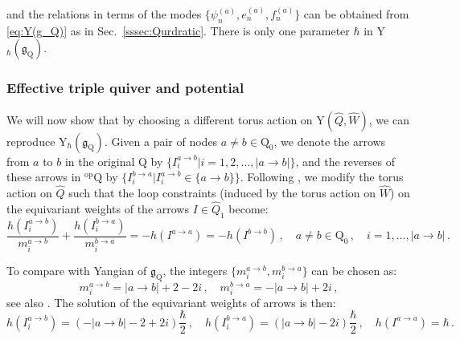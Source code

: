 \documentclass[12pt,a4paper]{article}
\renewcommand{\(}{\left(}
\renewcommand{\)}{\right)}
\renewcommand{\(}{\left(}
\renewcommand{\)}{\right)}
\begin{document}
\noindent and the relations in terms of the modes $\{\psi^{(a)}_n,e^{(a)}_n,f^{(a)}_n\}$ can be obtained from \eqref{eq:Y(g_Q)} as in Sec.~\ref{sssec:Qurdratic}.
There is only one parameter $\hbar$ in Y$_\hbar(\mathfrak{g}_{\mathrm{Q}})$.

\subsubsection{Effective triple quiver and potential}

We will now show that by choosing a different torus action on Y$(\widehat{Q},\widehat{W})$, we can reproduce Y$_\hbar(\mathfrak{g}_{\mathrm{Q}})$.
Given a pair of nodes $a\neq b\in\mathrm{Q}_0$, we denote the arrows from $a$ to $b$ in the original $\mathrm{Q}$ by $\{I^{a\rightarrow b}_i|i=1,2,\dots, |a\to b|\} $, and the reverses of these arrows in ${}^{\textrm{op}}\mathrm{Q}$ by $\{I^{b\rightarrow a}_i|I^{a\rightarrow b}_i\in \{a\to b\}\}$. 
Following \cite{Yang_2014}, we modify the torus action on $\widehat{Q}$ such that the loop constraints (induced by the torus action on $\widehat{W}$) on the equivariant weights of the arrows $I\in \widehat{Q}_1$ become:
\begin{equation}\label{eq:loop_constraints_assumption}
\frac{h(I^{a\rightarrow b}_i)}{m^{a\rightarrow b}_i }+\frac{h(I^{b\rightarrow a}_i) }{m^{b\rightarrow a}_i }=-h(I^{a\rightarrow a}) =-h(I^{b\rightarrow b})
\,, \quad a\neq b \in \mathrm{Q}_0\,, \quad 
i=1,\dots, |a\rightarrow b|\,.
\end{equation}

To compare with Yangian of $\mathfrak{g}_{\mathrm{Q}}$, the integers $\{m_i^{a\to b},m_{i}^{b\to a}\}$ can be chosen as:
\begin{equation}\label{eq:canonical_choice}
m^{a\rightarrow b}_{i}=|a\to b|+2-2i\,,\quad 
m^{b\rightarrow a}_i=-|a\to b|+2i\,,
\end{equation}
see also \cite{Yang_2014}.
The solution of the equivariant weights of arrows is then:
\begin{equation}\label{eq:canonical_weight}
h(I^{a\rightarrow b}_i)=(-|a\to b|-2+2i)\frac{\hbar}{2}\,, \quad h(I^{b\rightarrow a}_i)=(|a\to b|-2i)\frac{\hbar}{2}\,,
\quad 
h(I^{a\rightarrow a})=\hbar\,.
\end{equation}
\end{document}
